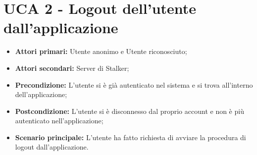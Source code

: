 \newpage
\section{UCA 2 - Logout dell'utente dall'applicazione}%
\begin{itemize}
\item \textbf{Attori primari:} Utente anonimo e Utente riconosciuto;
\item \textbf{Attori secondari:} Server di Stalker;
\item \textbf{Precondizione:} L’utente si è già autenticato nel sistema e si trova all’interno dell’applicazione;
\item \textbf{Postcondizione:}  L’utente si è disconnesso dal proprio account e non è più autenticato nell’applicazione;
\item \textbf{Scenario principale:} L'utente ha fatto richiesta di avviare la procedura di logout dall'applicazione.
\end{itemize}